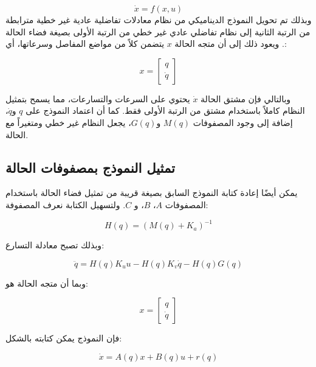 \begin{equation}
\dot{x}=f(x,u)
\label{eq:control_general_nonlinear_model}
\end{equation}
وبذلك تم تحويل النموذج الديناميكي من نظام معادلات تفاضلية عادية غير خطية مترابطة من الرتبة الثانية إلى نظام تفاضلي عادي غير خطي من الرتبة الأولى بصيغة فضاء الحالة . ويعود ذلك إلى أن متجه الحالة \(x\) يتضمن كلاً من مواضع المفاصل وسرعاتها، أي:

\begin{equation}
x=
\begin{bmatrix}
q\\
\dot{q}
\end{bmatrix}
\end{equation}

وبالتالي فإن مشتق الحالة \(\dot{x}\) يحتوي على السرعات والتسارعات، مما يسمح بتمثيل النظام كاملاً باستخدام مشتق من الرتبة الأولى فقط. كما أن اعتماد النموذج على \(q\) و\(\dot{q}\)، إضافة إلى وجود المصفوفات \(M(q)\) و\(G(q)\)، يجعل النظام غير خطي ومتغيراً مع الحالة.
\subsection{تمثيل النموذج بمصفوفات الحالة}

يمكن أيضًا إعادة كتابة النموذج السابق بصيغة قريبة من تمثيل فضاء الحالة باستخدام المصفوفات \(A\)، \(B\)، و \(C\). ولتسهيل الكتابة نعرف المصفوفة:

\begin{equation}
H(q)=\left(M(q)+K_a\right)^{-1}
\label{eq:control_H_matrix}
\end{equation}

وبذلك تصبح معادلة التسارع:

\begin{equation}
\ddot{q}
=
H(q)K_u u
-
H(q)K_v\dot{q}
-
H(q)G(q)
\label{eq:control_ddq_H_form}
\end{equation}

وبما أن متجه الحالة هو:

\begin{equation}
x=
\begin{bmatrix}
q\\
\dot{q}
\end{bmatrix}
\end{equation}

فإن النموذج يمكن كتابته بالشكل:

\begin{equation}
\dot{x}=A(q)x+B(q)u+r(q)
\label{eq:control_state_space_AB_r}
\end{equation}

